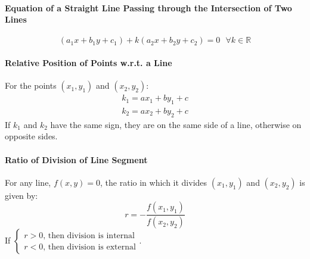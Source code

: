 \paragraph{Equation of a Straight Line Passing through the Intersection of Two Lines}
\begin{equation}
	(a_1x+b_1y+c_1)+k(a_2x+b_2y+c_2)=0\text{ }\forall k\in\mathbb{R}
\end{equation}

\paragraph{Relative Position of Points w.r.t. a Line}
For the points $(x_1,y_1)$ and $(x_2,y_2)$:
\begin{align}
	k_1=ax_1+by_1+c\nonumber\\
	k_2=ax_2+by_2+c\nonumber
\end{align}
If $k_1$ and $k_2$ have the same sign, they are on the same side of a line, otherwise on opposite sides.

\paragraph{Ratio of Division of Line Segment}
For any line, $f(x,y)=0$, the ratio in which it divides $(x_1,y_1)$ and $(x_2,y_2)$ is given by:
\begin{equation}
	r=-\dfrac{f(x_1,y_1)}{f(x_2,y_2)}
\end{equation}
If $\begin{cases}r>0\text{, then division is internal}\\r<0\text{, then division is external}\end{cases}$.

